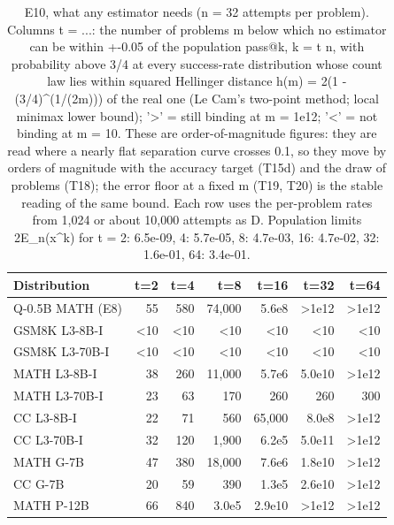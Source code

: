\begin{table}[t]
\centering
\small
\begin{tabular}{lrrrrrr}
\toprule
Distribution & t=2 & t=4 & t=8 & t=16 & t=32 & t=64 \\
\midrule
Q-0.5B MATH (E8) & 55 & 580 & 74,000 & 5.6e8 & >1e12 & >1e12 \\
GSM8K L3-8B-I & <10 & <10 & <10 & <10 & <10 & <10 \\
GSM8K L3-70B-I & <10 & <10 & <10 & <10 & <10 & <10 \\
MATH L3-8B-I & 38 & 260 & 11,000 & 5.7e6 & 5.0e10 & >1e12 \\
MATH L3-70B-I & 23 & 63 & 170 & 260 & 260 & 300 \\
CC L3-8B-I & 22 & 71 & 560 & 65,000 & 8.0e8 & >1e12 \\
CC L3-70B-I & 32 & 120 & 1,900 & 6.2e5 & 5.0e11 & >1e12 \\
MATH G-7B & 47 & 380 & 18,000 & 7.6e6 & 1.8e10 & >1e12 \\
CC G-7B & 20 & 59 & 390 & 1.3e5 & 2.6e10 & >1e12 \\
MATH P-12B & 66 & 840 & 3.0e5 & 2.9e10 & >1e12 & >1e12 \\
\bottomrule
\end{tabular}
\caption{E10, what any estimator needs (n = 32 attempts per problem). Columns t = ...: the number of problems m below which no estimator can be within +-0.05 of the population pass@k, k = t n, with probability above 3/4 at every success-rate distribution whose count law lies within squared Hellinger distance h(m) = 2(1 - (3/4)^(1/(2m))) of the real one (Le Cam's two-point method; local minimax lower bound); '>' = still binding at m = 1e12; '<' = not binding at m = 10. These are order-of-magnitude figures: they are read where a nearly flat separation curve crosses 0.1, so they move by orders of magnitude with the accuracy target (T15d) and the draw of problems (T18); the error floor at a fixed m (T19, T20) is the stable reading of the same bound. Each row uses the per-problem rates from 1,024 or about 10,000 attempts as D. Population limits 2E\_n(x^k) for t = 2: 6.5e-09, 4: 5.7e-05, 8: 4.7e-03, 16: 4.7e-02, 32: 1.6e-01, 64: 3.4e-01.}
\label{tab:T15_problems_needed_any_estimator}
\end{table}
